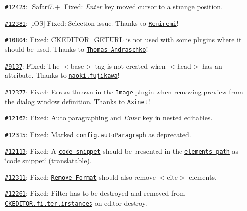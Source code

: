 \begin{DoxyItemize}
\item \href{http://dev.ckeditor.com/ticket/12423}{\tt \#12423}\+: \mbox{[}Safari7.+\mbox{]} Fixed\+: {\itshape Enter} key moved cursor to a strange position.
\item \href{http://dev.ckeditor.com/ticket/12381}{\tt \#12381}\+: \mbox{[}i\+OS\mbox{]} Fixed\+: Selection issue. Thanks to \href{https://github.com/Remiremi}{\tt Remiremi}!
\item \href{http://dev.ckeditor.com/ticket/10804}{\tt \#10804}\+: Fixed\+: {\ttfamily C\+K\+E\+D\+I\+T\+O\+R\+\_\+\+G\+E\+T\+U\+RL} is not used with some plugins where it should be used. Thanks to \href{https://github.com/tandraschko}{\tt Thomas Andraschko}!
\item \href{http://dev.ckeditor.com/ticket/9137}{\tt \#9137}\+: Fixed\+: The {\ttfamily $<$base$>$} tag is not created when {\ttfamily $<$head$>$} has an attribute. Thanks to \href{https://github.com/naoki-fujikawa}{\tt naoki.\+fujikawa}!
\item \href{http://dev.ckeditor.com/ticket/12377}{\tt \#12377}\+: Fixed\+: Errors thrown in the \href{http://ckeditor.com/addon/image}{\tt Image} plugin when removing preview from the dialog window definition. Thanks to \href{https://github.com/Axinet}{\tt Axinet}!
\item \href{http://dev.ckeditor.com/ticket/12162}{\tt \#12162}\+: Fixed\+: Auto paragraphing and {\itshape Enter} key in nested editables.
\item \href{http://dev.ckeditor.com/ticket/12315}{\tt \#12315}\+: Fixed\+: Marked \href{http://docs.ckeditor.com/#!/api/CKEDITOR.config-cfg-autoParagraph}{\tt {\ttfamily config.\+auto\+Paragraph}} as deprecated.
\item \href{http://dev.ckeditor.com/ticket/12113}{\tt \#12113}\+: Fixed\+: A \href{http://ckeditor.com/addon/codesnippet}{\tt code snippet} should be presented in the \href{http://ckeditor.com/addon/elementspath}{\tt elements path} as \char`\"{}code snippet\char`\"{} (translatable).
\item \href{http://dev.ckeditor.com/ticket/12311}{\tt \#12311}\+: Fixed\+: \href{http://ckeditor.com/addon/removeformat}{\tt Remove Format} should also remove {\ttfamily $<$cite$>$} elements.
\item \href{http://dev.ckeditor.com/ticket/12261}{\tt \#12261}\+: Fixed\+: Filter has to be destroyed and removed from \href{http://docs.ckeditor.com/#!/api/CKEDITOR.filter-static-property-instances}{\tt {\ttfamily C\+K\+E\+D\+I\+T\+O\+R.\+filter.\+instances}} on editor destroy.

\end{DoxyItemize}
